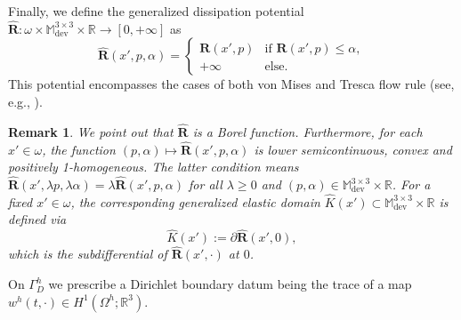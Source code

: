 \documentclass[reqno,10pt]{amsart}
\numberwithin{equation}{section}
\newtheorem{remark}[theorem]{Remark}
\theoremstyle{remark}
\newcommand{\BLACK}{\color{black}}
\newcommand{\PINK}{\color{black}}
\newcommand{\M}{\mathbb{M}}
\newcommand{\R}{\mathbb{R}}
\DeclareMathOperator{\dev}{dev}
\newcommand{\Dir}{D}
\newcommand{\disspot}{\mathbf{R}}
\newcommand{\gendisspot}{\widehat{\disspot}}
\begin{document}
Finally, we define the generalized dissipation potential $\gendisspot : \omega \times \M^{3 \times 3}_{\dev} \times \R \to [0,+\infty]$ as
\begin{equation} \label{dissipation potential with hardening}
	\gendisspot(x', p, \alpha)
	=
	\begin{cases}
	\disspot(x', p) & \text{if $\disspot(x', p) \leq \alpha$}, \\
	+ \infty & \text{else}.
	\end{cases}
\end{equation}
This potential encompasses the cases of both von Mises and Tresca flow rule (see, e.g., \cite[Section 4]{han2012plasticity}).

\begin{remark} \label{remark on Reshetnyak theorem conditions - gendisspot}
We point out that $\gendisspot$ is a Borel function.
Furthermore, for each $x' \in \omega$, the function $(p, \alpha) \mapsto \gendisspot(x', p, \alpha)$ is lower semicontinuous, convex and positively 1-homogeneous.
The {\PINK latter condition means\BLACK} $\gendisspot(x', \lambda p,\lambda \alpha) = \lambda \gendisspot(x', p, \alpha)$ for all $\lambda \geq 0$ and $(p, \alpha) \in \M^{3 \times 3}_{\dev} \times \R$.
For a fixed $x' \in \omega$, the corresponding generalized elastic domain $\widehat{K}(x') \subset \M^{3 \times 3}_{\dev} \times \R$ is defined via 
\begin{equation*}
	\widehat{K}(x') := \partial \gendisspot(x', 0),
\end{equation*}
which is the subdifferential of $\gendisspot(x', \cdot)$ at $0$.
\end{remark}

\medskip
{} \nopagebreak

On $\Gamma_\Dir^h$ we prescribe a Dirichlet boundary datum being the trace of a map $w^h(t,\cdot) \in H^1(\Omega^h;\R^3)$.
\end{document}

